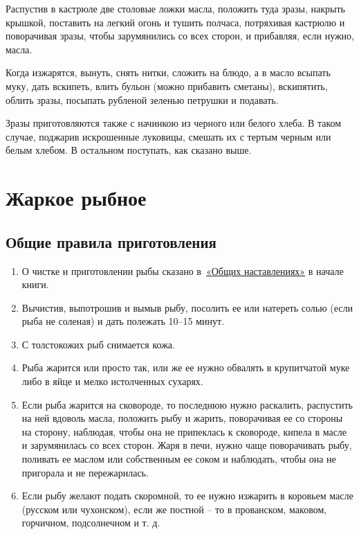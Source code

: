 Распустив в кастрюле две столовые ложки масла, положить туда зразы, накрыть крышкой, поставить на легкий огонь и тушить полчаса, потряхивая кастрюлю и поворачивая зразы, чтобы зарумянились со всех сторон, и прибавляя, если нужно, масла.

Когда изжарятся, вынуть, снять нитки, сложить на блюдо, а в масло всыпать муку, дать вскипеть, влить бульон (можно прибавить сметаны), вскипятить, облить зразы, посыпать рубленой зеленью петрушки и подавать.

Зразы приготовляются также с начинкою из черного или белого хлеба. В таком случае, поджарив искрошенные луковицы, смешать их с тертым черным или белым хлебом. В остальном поступать, как сказано выше.

\newpage
\section{Жаркое рыбное}

\subsection*{Общие правила приготовления} \label{4sec:obschie-ryb-zhar}

\begin{enumerate}
	\item О чистке и приготовлении рыбы сказано в~\hyperref[0sec:obsch-nast]{«Общих наставлениях»} в начале книги.
	\item Вычистив, выпотрошив и вымыв рыбу, посолить ее или натереть солью (если рыба не соленая) и дать полежать 10–15 минут.
	\item С толстокожих рыб снимается кожа.
	\item Рыба жарится или просто так, или же ее нужно обвалять в крупитчатой муке либо в яйце и мелко истолченных сухарях.
	\item Если рыба жарится на сковороде, то последнюю нужно раскалить, распустить на ней вдоволь масла, положить рыбу и жарить, поворачивая ее со стороны на сторону, наблюдая, чтобы она не припеклась к сковороде, кипела в масле и зарумянилась со всех сторон. Жаря в печи, нужно чаще поворачивать рыбу, поливать ее маслом или собственным ее соком и наблюдать, чтобы она не пригорала и не пережарилась.
	\item Если рыбу желают подать скоромной, то ее нужно изжарить в коровьем масле (русском или чухонском), если же постной – то в прованском, маковом, горчичном, подсолнечном и т. д.
\end{enumerate}

